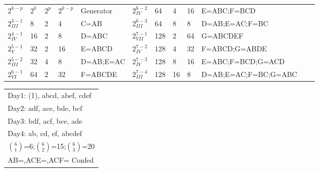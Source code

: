 \documentclass[
  10pt,
  twocolumn]{article}
\begin{document}
\begin{tabular}{ l|l|l|l|l|l||l|l|l|l|l|l }
$2^{k-p}$      &$2^k$&$2^{p}$&$2^{k-p}$&Generator & $2^{6-2}_{IV}$ &64 &4 &16&  {\scriptsize E=ABC;F=BCD} \\
$2^{3-1}_{III}$&8  &2 &4 &  C=AB & $2^{6-3}_{III}$&64 &8 &8 &  {\scriptsize D=AB;E=AC;F=BC}\\
$2^{4-1}_{IV}$ &16 &2 &8 &  D=ABC & $2^{7-1}_{VII}$&128&2 &64&  G=ABCDEF\\
$2^{5-1}_{V}$  &32 &2 &16&  E=ABCD & $2^{7-2}_{IV}$ &128&4 &32&  {\scriptsize F=ABCD;G=ABDE} \\
$2^{5-2}_{III}$&32 &4 & 8&{\scriptsize D=AB;E=AC}& $2^{7-3}_{IV}$ &128&8 &16&  {\tiny E=ABC;F=BCD;G=ACD} \\
$2^{6-1}_{VI}$ &64 &2 &32&  F=ABCDE   & $2^{7-4}_{III}$&128&16&8 &  {\tiny D=AB;E=AC;F=BC;G=ABC}
\end{tabular}
\begin{tabular}{ |l }
Day1: (1), abcd, abef, cdef\\
Day2: adf, ace, bde, bcf\\
Day3: bdf, acf, bce, ade\\
Day4: ab, cd, ef, abcdef\\
${6}\choose{1}$=6;${6}\choose{2}$=15;${6}\choose{3}$=20\\
{\scriptsize AB=,ACE=,ACF= Confed}\\
\end{tabular}
\end{document}
